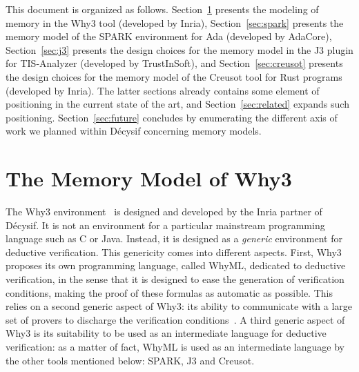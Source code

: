 \documentclass[a4paper,11pt]{article}
\begin{document}
This document is organized as follows. Section~\ref{sec:why3} presents the
modeling of memory in the Why3 tool (developed by Inria),
Section~\ref{sec:spark} presents the memory model of the SPARK environment for
Ada (developed by AdaCore), Section~\ref{sec:j3} presents the design choices for
the memory model in the J3 plugin for TIS-Analyzer (developed by TrustInSoft),
and Section~\ref{sec:creusot} presents the design choices for the memory model of
the Creusot tool for Rust programs (developed by Inria). The latter sections
already contains some element of positioning in the current state of the art,
and Section~\ref{sec:related} expands such positioning. Section~\ref{sec:future}
concludes by enumerating the different axis of work we planned within Décysif
concerning memory models.

\section{The Memory Model of Why3}
\label{sec:why3}


The Why3
environment~\cite{filliatre13esop,bobot14sttt,blazy19fmtea,paskevich20isola} is
designed and developed by the Inria partner of Décysif. It is not an environment
for a particular mainstream programming language such as C or Java. Instead, it
is designed as a \emph{generic} environment for deductive verification. This
genericity comes into different aspects. First, Why3 proposes its own
programming language, called WhyML, dedicated to deductive verification, in the
sense that it is designed to ease the generation of verification conditions,
making the proof of these formulas as automatic as possible. This relies on a
second generic aspect of Why3: its ability to communicate with a large set of
provers to discharge the verification conditions~\cite{boogie11why3}. A third
generic aspect of Why3 is its suitability to be used as an intermediate language
for deductive verification: as a matter of fact, WhyML is used as an
intermediate language by the other tools mentioned below: SPARK, J3 and Creusot.
\end{document}
